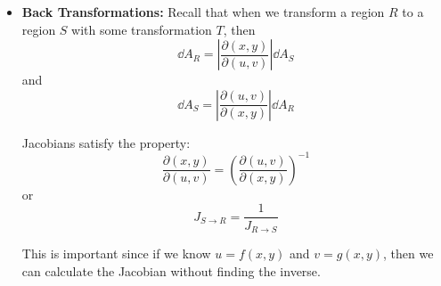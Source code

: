 \begin{itemize}
\begin{equation}
    \end{equation}
    \item \textbf{Back Transformations:} Recall that when we transform a region $R$ to a region $S$ with some transformation $T$, then 
    \begin{equation}
        \dd{A}_R = \left|\frac{\partial (x,y)}{\partial (u,v)}\right|\dd{A}_S
    \end{equation}
    and 
    \begin{equation}
        \dd{A}_S = \left|\frac{\partial (u,v)}{\partial (x,y)}\right|\dd{A}_R
    \end{equation}
    \begin{theorem}
        Jacobians satisfy the property: 
        \begin{equation}
            \frac{\partial(x,y)}{\partial(u,v)} = \left(\frac{\partial(u,v)}{\partial (x,y)}\right)^{-1}
        \end{equation}
        or 
        \begin{equation}
            J_{S\rightarrow R} = \frac{1}{J_{R\rightarrow S}}
        \end{equation}
    \end{theorem}
    \begin{idea}
        This is important since if we know $u=f(x,y)$ and $v=g(x,y)$, then we can calculate the Jacobian without finding the inverse. 
    \end{idea}
\end{itemize}